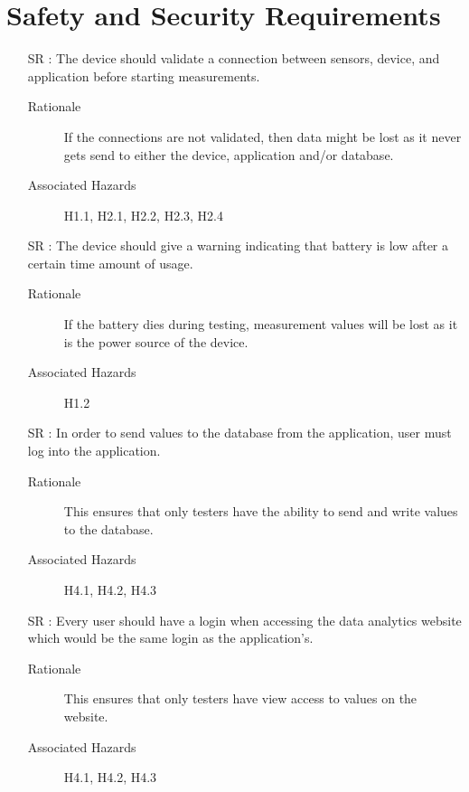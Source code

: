 \documentclass{article}
\newcounter{reqnum} %
\begin{document}

\section{Safety and Security Requirements}

\begin{itemize}
  \item[SR \refstepcounter{reqnum}\thereqnum:] The device should validate a connection between sensors, device, and application before starting measurements.
    \begin{description} \item[Rationale] If the connections are not validated, then data might be lost as it never gets send to either the device, application and/or database.  \end{description}
    \begin{description} \item[Associated Hazards] H1.1, H2.1, H2.2, H2.3, H2.4  \end{description}
  
  \item[SR \refstepcounter{reqnum}\thereqnum:] The device should give a warning indicating that battery is low after a certain time amount of usage.
    \begin{description} \item[Rationale] If the battery dies during testing, measurement values will be lost as it is the power source of the device.  \end{description}
    \begin{description} \item[Associated Hazards] H1.2  \end{description}
  
  \item[SR \refstepcounter{reqnum}\thereqnum:] In order to send values to the database from the application, user must log into the application.
    \begin{description} \item[Rationale] This ensures that only testers have the ability to send and write values to the database.   \end{description}
    \begin{description} \item[Associated Hazards] H4.1, H4.2, H4.3 \end{description}
    
  \item[SR \refstepcounter{reqnum}\thereqnum:] Every user should have a login when accessing the data analytics website which would be the same login as the application's.
    \begin{description} \item[Rationale] This ensures that only testers have view access to values on the website.   \end{description}
    \begin{description} \item[Associated Hazards] H4.1, H4.2, H4.3 \end{description}
  

\end{itemize}
\end{document}
